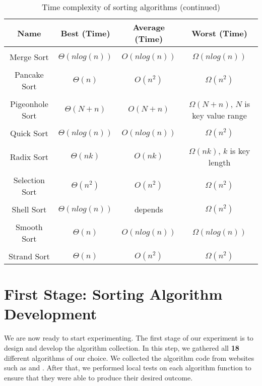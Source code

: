 \begin{table}[h!]
\centering
\begin{tabular}{||c c c c||} 
\hline
Name & Best (Time) & Average (Time) & Worst (Time) \\ [1ex] 
\hline\hline
 & & & \\
Merge Sort & \(\Theta(nlog(n))\) & \(O(nlog(n))\) & \(\Omega(nlog(n))\) \\ 
 & & & \\
Pancake Sort & \(\Theta(n)\) & \(O(n^2)\) & \(\Omega(n^2)\) \\
 & & & \\
Pigeonhole Sort & \(\Theta(N+n)\) & \(O(N+n)\) & \(\Omega(N+n)\), \(N\) is key value range \\ 
 & & & \\
Quick Sort & \(\Theta(nlog(n))\) & \(O(nlog(n))\) & \(\Omega(n^2)\) \\ 
 & & & \\
Radix Sort & \(\Theta(nk)\) & \(O(nk)\) & \(\Omega(nk)\), \(k\) is key length \\
 & & & \\
Selection Sort & \(\Theta(n^2)\) & \(O(n^2)\) & \(\Omega(n^2)\) \\ 
 & & & \\
Shell Sort & \(\Theta(nlog(n))\) & depends & \(\Omega(n^2)\) \\ 
 & & & \\
Smooth Sort & \(\Theta(n)\) & \(O(nlog(n))\) & \(\Omega(nlog(n))\) \\ 
 & & & \\
Strand Sort & \(\Theta(n)\) & \(O(n^2)\) & \(\Omega(n^2)\) \\ [1ex]
\hline
\end{tabular}
\caption{Time complexity of sorting algorithms (continued)}
\label{table:time_complexity_2}
\end{table}
\bigskip

\bigskip
\section{First Stage: Sorting Algorithm Development}

We are now ready to start experimenting. The first stage of our experiment is to design and develop the algorithm collection. In this step, we gathered all \textbf{18} different algorithms of our choice. We collected the algorithm code from websites such as \href{https://www.geeksforgeeks.org/}{\color{blue}{geeksforgeeks.org}} and \href{https://www.programiz.com/}{\color{blue}{programiz.com}}. After that, we performed local tests on each algorithm function to ensure that they were able to produce their desired outcome.

